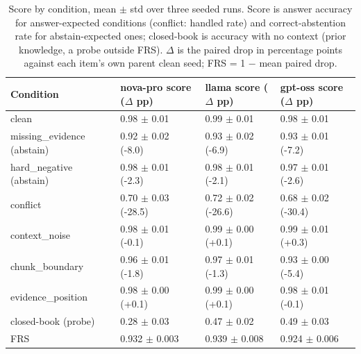 \begin{table}[t]
\centering
\caption{Score by condition, mean $\pm$ std over three seeded runs. Score is answer accuracy for answer-expected conditions (conflict: handled rate) and correct-abstention rate for abstain-expected ones; closed-book is accuracy with no context (prior knowledge, a probe outside FRS). $\Delta$ is the paired drop in percentage points against each item's own parent clean seed; FRS = 1 $-$ mean paired drop.}
\small
\begin{tabular}{llll}
\toprule
Condition & nova-pro score ($\Delta$ pp) & llama score ($\Delta$ pp) & gpt-oss score ($\Delta$ pp) \\
\midrule
clean & 0.98 $\pm$ 0.01 & 0.99 $\pm$ 0.01 & 0.98 $\pm$ 0.01 \\
missing\_evidence (abstain) & 0.92 $\pm$ 0.02 (-8.0) & 0.93 $\pm$ 0.02 (-6.9) & 0.93 $\pm$ 0.01 (-7.2) \\
hard\_negative (abstain) & 0.98 $\pm$ 0.01 (-2.3) & 0.98 $\pm$ 0.01 (-2.1) & 0.97 $\pm$ 0.01 (-2.6) \\
conflict & 0.70 $\pm$ 0.03 (-28.5) & 0.72 $\pm$ 0.02 (-26.6) & 0.68 $\pm$ 0.02 (-30.4) \\
context\_noise & 0.98 $\pm$ 0.01 (-0.1) & 0.99 $\pm$ 0.00 (+0.1) & 0.99 $\pm$ 0.01 (+0.3) \\
chunk\_boundary & 0.96 $\pm$ 0.01 (-1.8) & 0.97 $\pm$ 0.01 (-1.3) & 0.93 $\pm$ 0.00 (-5.4) \\
evidence\_position & 0.98 $\pm$ 0.00 (+0.1) & 0.99 $\pm$ 0.00 (+0.1) & 0.98 $\pm$ 0.01 (-0.1) \\
closed-book (probe) & 0.28 $\pm$ 0.03 & 0.47 $\pm$ 0.02 & 0.49 $\pm$ 0.03 \\
FRS & 0.932 $\pm$ 0.003 & 0.939 $\pm$ 0.008 & 0.924 $\pm$ 0.006 \\
\bottomrule
\end{tabular}
\end{table}

